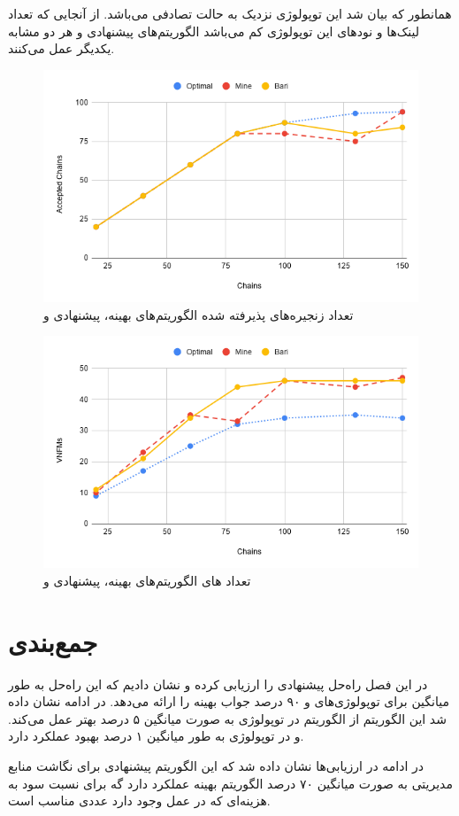 همانطور که بیان شد این توپولوژی نزدیک به حالت تصادفی می‌باشد.
از آنجایی که تعداد لینک‌ها و نودهای این توپولوژی کم می‌باشد الگوریتم‌های پیشنهادی و \cite{Bari2015} هر دو مشابه یکدیگر عمل می‌کنند.


\begin{figure}[h]
\center\includegraphics[scale=.5]{images/chart-7}
\caption{تعداد زنجیره‌های پذیرفته شده الگوریتم‌های بهینه، پیشنهادی و \cite{Bari2015}}
\label{fig.12}
\end{figure}

\begin{figure}[h]
\center\includegraphics[scale=.5]{images/chart-8}
\caption{تعداد های الگوریتم‌های بهینه، پیشنهادی و \cite{Bari2015}}
\label{fig.13}
\end{figure}

\section{جمع‌بندی}
در این فصل راه‌حل پیشنهادی را ارزیابی کرده و نشان دادیم
که این راه‌حل به طور میانگین برای توپولوژی‌های  و 
۹۰ درصد جواب بهینه را ارائه می‌دهد.
در ادامه نشان داده شد این الگوریتم از الگوریتم \cite{Bari2015}
در توپولوژی 
به صورت میانگین ۵ درصد بهتر عمل می‌کند.
و در توپولوژی 
به طور میانگین ۱ درصد بهبود عملکرد دارد.

در ادامه در ارزیابی‌ها نشان داده شد که این الگوریتم پیشنهادی برای نگاشت منابع مدیریتی
به صورت میانگین ۷۰ درصد الگوریتم بهینه عملکرد دارد
گه برای نسبت سود به هزینه‌ای که در عمل وجود دارد عددی مناسب است.